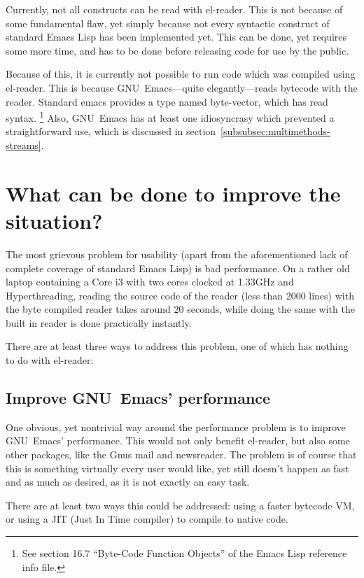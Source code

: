 \documentclass[a4paper,10pt,twoside]{report}
\newcommand{\el}{Emacs Lisp}
\newcommand{\elr}{el-reader}
\newcommand{\emacs}{GNU~Emacs}
\begin{document}
Currently, not all constructs can be read with \elr{}.  This is not because of
some fundamental flaw, yet simply because not every syntactic construct of
standard \el{} has been implemented yet.  This can be done, yet requires some
more time, and has to be done before releasing code for use by the public.

Because of this, it is currently not possible to run code which was compiled
using \elr{}.  This is because \emacs{}---quite elegantly---reads bytecode with
the reader.  Standard emacs provides a type named byte-vector, which has read
syntax. \footnote{See section 16.7 “Byte-Code Function Objects” of the \el{}
  reference info file.\cite{elisp-reference}} Also, \emacs{} has at least one
idiosyncrasy which prevented a straightforward use, which is discussed in
section~\ref{subsubsec:multimethods-streams}.

\section{What can be done to improve the situation?}
\label{sec:improve-situation}

The most grievous problem for usability (apart from the aforementioned lack of
complete coverage of standard \el{}) is bad performance.  On a rather old laptop
containing a Core i3 with two cores clocked at 1.33GHz and Hyperthreading,
reading the source code of the reader (less than 2000 lines) with the byte
compiled reader takes around 20 seconds, while doing the same with the built in
reader is done practically instantly.

There are at least three ways to address this problem, one of which has nothing
to do with \elr{}:

\subsection{Improve \emacs{}’ performance}
\label{subsec:impr-emacs-perf}

One obvious, yet nontrivial way around the performance problem is to improve
\emacs{}’ performance.  This would not only benefit \elr{}, but also some other
packages, like the Gnus mail and newsreader.\cite{gnus}  The problem is of
course that this is something virtually every user would like, yet still doesn’t
happen as fast and as much as desired, as it is not exactly an easy task.

There are at least two ways this could be addressed: using a faster bytecode VM,
or using a JIT (Just In Time compiler) to compile to native code.
\end{document}
